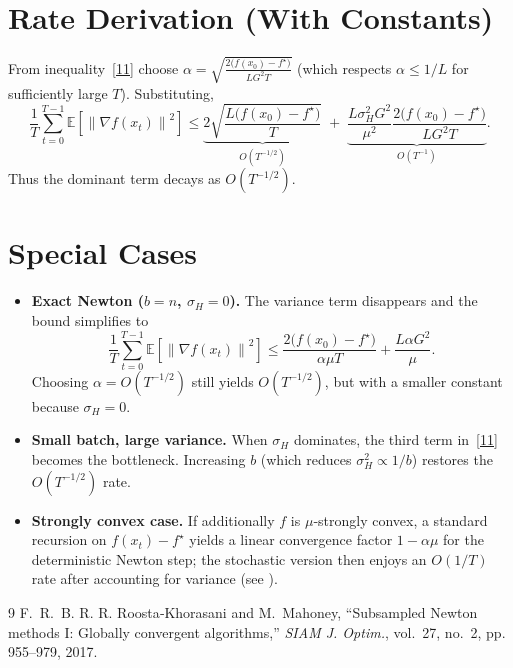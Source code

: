 \documentclass{article}
\newcommand{\E}{\mathbb{E}}
\newcommand{\norm}[1]{\left\|#1\right\|}
\begin{document}
\section*{Rate Derivation (With Constants)}
From inequality~\eqref{11} choose $\alpha = \sqrt{\frac{2\bigl(f(x_0)-f^{\star}\bigr)}{L G^{2}T}}$ (which respects $\alpha\le 1/L$ for sufficiently large $T$). Substituting,
\[
\frac{1}{T}\sum_{t=0}^{T-1}\E\!\left[\norm{\nabla f(x_t)}^{2}\right]
\le
\underbrace{2\sqrt{\frac{L\bigl(f(x_0)-f^{\star}\bigr)}{T}}}_{\displaystyle O(T^{-1/2})}
\;+\;
\underbrace{\frac{L\sigma_H^{2}G^{2}}{\mu^{2}}\frac{2\bigl(f(x_0)-f^{\star}\bigr)}{L G^{2}T}}_{O(T^{-1})}.
\]
Thus the dominant term decays as $O(T^{-1/2})$.

\section*{Special Cases}
\begin{itemize}[leftmargin=*]
  \item \textbf{Exact Newton ($b=n$, $\sigma_H=0$).}  
    The variance term disappears and the bound simplifies to
    \[
    \frac{1}{T}\sum_{t=0}^{T-1}\E\!\left[\norm{\nabla f(x_t)}^{2}\right]
    \le \frac{2\bigl(f(x_0)-f^{\star}\bigr)}{\alpha\mu T}
    +\frac{L\alpha G^{2}}{\mu}.
    \]
    Choosing $\alpha=O(T^{-1/2})$ still yields $O(T^{-1/2})$, but with a smaller constant because $\sigma_H=0$.
  \item \textbf{Small batch, large variance.}  
    When $\sigma_H$ dominates, the third term in~\eqref{11} becomes the bottleneck. Increasing $b$ (which reduces $\sigma_H^{2}\propto 1/b$) restores the $O(T^{-1/2})$ rate.
  \item \textbf{Strongly convex case.}  
    If additionally $f$ is $\mu$‑strongly convex, a standard recursion on $f(x_t)-f^{\star}$ yields a linear convergence factor $1-\alpha\mu$ for the deterministic Newton step; the stochastic version then enjoys an $O(1/T)$ rate after accounting for variance (see \cite{roosta2016subsampled}).
\end{itemize}

\begin{thebibliography}{9}
F.~R.~B. R. R. Roosta‑Khorasani and M.~Mahoney, ``Subsampled Newton methods I: Globally convergent algorithms,'' \emph{SIAM J. Optim.}, vol.~27, no.~2, pp. 955–979, 2017.
\end{thebibliography}
\end{document}
